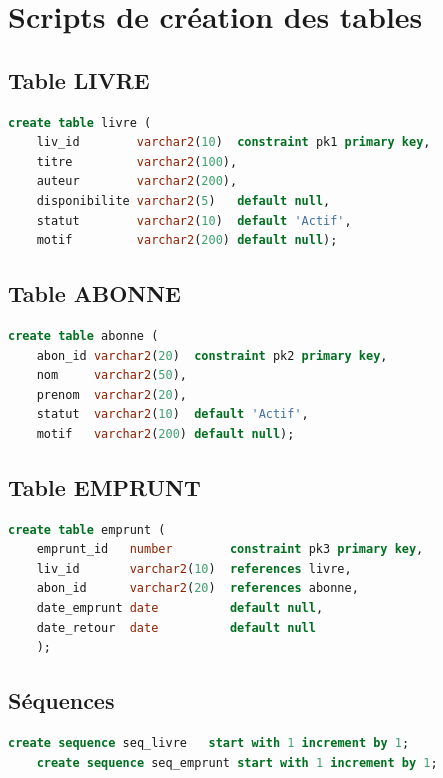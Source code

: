 \documentclass[12pt, a4paper]{report}
\begin{document}
\chapter{Scripts de création des tables}

\section{Table LIVRE}
\begin{lstlisting}[language=SQL, caption=Création de la table Livre]
	create table livre (
	liv_id        varchar2(10)  constraint pk1 primary key,
	titre         varchar2(100),
	auteur        varchar2(200),
	disponibilite varchar2(5)   default null,
	statut        varchar2(10)  default 'Actif',
	motif         varchar2(200) default null);
\end{lstlisting}

\section{Table ABONNE}
\begin{lstlisting}[language=SQL, caption=Création de la table Abonné]
	create table abonne (
	abon_id varchar2(20)  constraint pk2 primary key,
	nom     varchar2(50),
	prenom  varchar2(20),
	statut  varchar2(10)  default 'Actif',
	motif   varchar2(200) default null);
\end{lstlisting}

\section{Table EMPRUNT}
\begin{lstlisting}[language=SQL, caption=Création de la table Emprunt]
	create table emprunt (
	emprunt_id   number        constraint pk3 primary key,
	liv_id       varchar2(10)  references livre,
	abon_id      varchar2(20)  references abonne,
	date_emprunt date          default null,
	date_retour  date          default null
	);
\end{lstlisting}

\section{Séquences}
\begin{lstlisting}[language=SQL, caption=Création des séquences]
	create sequence seq_livre   start with 1 increment by 1;
	create sequence seq_emprunt start with 1 increment by 1;
\end{lstlisting}
\end{document}
